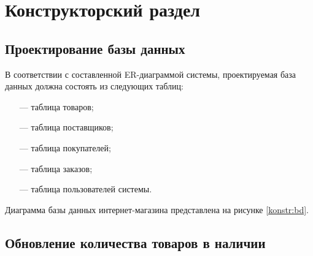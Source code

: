 \section{Конструкторский раздел}

\subsection{Проектирование базы данных}

В соответствии с составленной ER-диаграммой системы, проектируемая база данных должна состоять из следующих таблиц:

\begin{itemize}[leftmargin=0.7cm +  - ]
	\item[---] таблица товаров;
	\item[---] таблица поставщиков;
	\item[---] таблица покупателей;
	\item[---] таблица заказов;
	\item[---] таблица пользователей системы.
\end{itemize}

Диаграмма базы данных интернет-магазина представлена на рисунке \ref{konstr:bd}.

\begin{figure}[H]
\end{figure}

\subsection{Обновление количества товаров в наличии}

